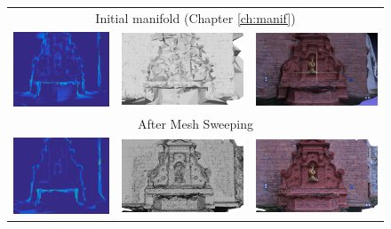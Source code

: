 \begin{figure}[t]
\begin{tabular}{ccc}
\multicolumn{3}{c}{Initial manifold (Chapter \ref{ch:manif})}\\
\includegraphics[width=0.32\columnwidth,height=0.25\columnwidth]{./img/errorMyFountainNotSm}&
\includegraphics[width=0.32\columnwidth,height=0.25\columnwidth]{./img/myResUntex}&
\includegraphics[width=0.32\columnwidth,height=0.25\columnwidth]{./img/myresTex}\\
\multicolumn{3}{c}{After Mesh Sweeping}\\
\includegraphics[width=0.32\columnwidth,height=0.25\columnwidth]{./img/Photofount}&
\includegraphics[width=0.32\columnwidth,height=0.25\columnwidth]{./img/photo_mesh_crop}&
\includegraphics[width=0.32\columnwidth,height=0.25\columnwidth]{./img/photo_mesh_rgb_crop}\\

\end{tabular}
\end{figure}
